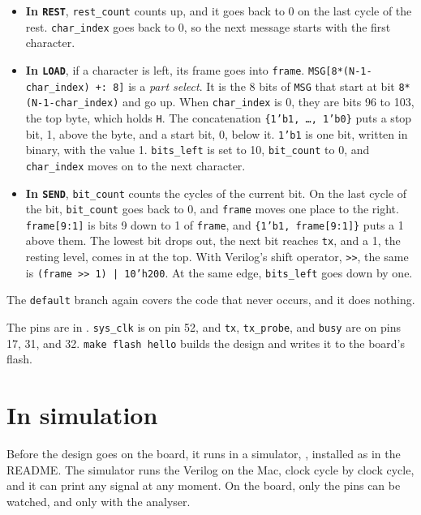 \documentclass[11pt,a4paper]{article}
\begin{document}
\begin{itemize}
  \item \textbf{In \texttt{REST}}, \texttt{rest\_count} counts up, and it goes back to 0 on the last cycle of the rest. \texttt{char\_index} goes back to 0, so the next message starts with the first character.
  \item \textbf{In \texttt{LOAD}}, if a character is left, its frame goes into \texttt{frame}. \texttt{MSG[8*(N-1-char\_index) +: 8]} is a \emph{part select}. It is the 8 bits of \texttt{MSG} that start at bit \texttt{8*(N-1-char\_index)} and go up. When \texttt{char\_index} is 0, they are bits 96 to 103, the top byte, which holds \texttt{H}. The concatenation \texttt{\{1'b1, …, 1'b0\}} puts a stop bit, 1, above the byte, and a start bit, 0, below it. \texttt{1'b1} is one bit, written in binary, with the value 1. \texttt{bits\_left} is set to 10, \texttt{bit\_count} to 0, and \texttt{char\_index} moves on to the next character.
  \item \textbf{In \texttt{SEND}}, \texttt{bit\_count} counts the cycles of the current bit. On the last cycle of the bit, \texttt{bit\_count} goes back to 0, and \texttt{frame} moves one place to the right. \texttt{frame[9:1]} is bits 9 down to 1 of \texttt{frame}, and \texttt{\{1'b1, frame[9:1]\}} puts a 1 above them. The lowest bit drops out, the next bit reaches \texttt{tx}, and a 1, the resting level, comes in at the top. With Verilog’s shift operator, \texttt{>>}, the same is \texttt{(frame >> 1) | 10'h200}. At the same edge, \texttt{bits\_left} goes down by one.
\end{itemize}

The \texttt{default} branch again covers the code that never occurs, and it does nothing.

The pins are in . \texttt{sys\_clk} is on pin 52, and \texttt{tx}, \texttt{tx\_probe}, and \texttt{busy} are on pins 17, 31, and 32. \texttt{make flash hello} builds the design and writes it to the board’s flash.

\section*{In simulation}

Before the design goes on the board, it runs in a simulator, , installed as in the README. The simulator runs the Verilog on the Mac, clock cycle by clock cycle, and it can print any signal at any moment. On the board, only the pins can be watched, and only with the analyser.
\end{document}

